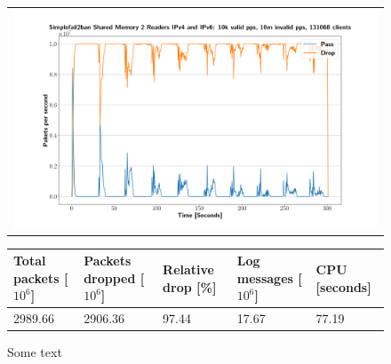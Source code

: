 \begin{figure}[p]
	\label{fig:simplefail2ban:shm:2r}
	\centering
	\scriptsize
	\begin{tabular}{c}
    	\centerline{\includegraphics[width=1.2\textwidth]{images/simplefail2ban_shm_2r_ipv46_v10k_iv10m_c131068.png}}
	\end{tabular}
	\begin{tabular}{lllll}
		\toprule
		\textbf{Total packets [$10^6$]} & \textbf{Packets dropped [$10^6$]} & \textbf{Relative drop [\%]} & \textbf{Log messages [$10^6$]} & \textbf{CPU [seconds]} \\ \midrule 
		2989.66 & 2906.36 & 97.44 & 17.67 & 77.19 \\
		\bottomrule
	\end{tabular}
	\caption[Simplefail2ban Shared Memory 2 Readers]{Some text}
\end{figure}

